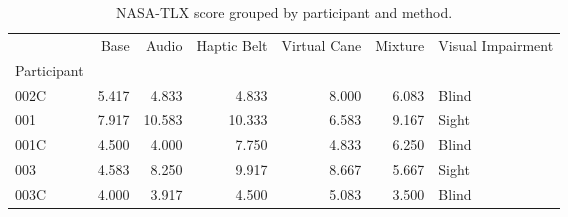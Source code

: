 
\begin{table}[!htb]
\centering
\caption{NASA-TLX score grouped by participant and method.}
\label{tab:nasa_average}
\begin{tabular}{lrrrrrl}
\toprule
{} &  Base &  Audio &  Haptic Belt &  Virtual Cane &  Mixture & Visual Impairment \\
Participant &       &        &              &               &          &                   \\
\midrule
002C        & 5.417 &  4.833 &        4.833 &         8.000 &    6.083 &             Blind \\
001         & 7.917 & 10.583 &       10.333 &         6.583 &    9.167 &             Sight \\
001C        & 4.500 &  4.000 &        7.750 &         4.833 &    6.250 &             Blind \\
003         & 4.583 &  8.250 &        9.917 &         8.667 &    5.667 &             Sight \\
003C        & 4.000 &  3.917 &        4.500 &         5.083 &    3.500 &             Blind \\
\bottomrule
\end{tabular}
\end{table}

